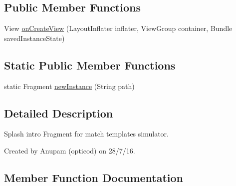 \subsection*{Public Member Functions}
\begin{DoxyCompactItemize}
\item 
View \hyperlink{classorg_1_1buildmlearn_1_1toolkit_1_1matchtemplate_1_1fragment_1_1SplashFragment_a5b24c740ffea58392c92a4217a4dd987}{on\+Create\+View} (Layout\+Inflater inflater, View\+Group container, Bundle saved\+Instance\+State)
\end{DoxyCompactItemize}
\subsection*{Static Public Member Functions}
\begin{DoxyCompactItemize}
\item 
static Fragment \hyperlink{classorg_1_1buildmlearn_1_1toolkit_1_1matchtemplate_1_1fragment_1_1SplashFragment_a62da45592d72fc7caea554cc66562ff7}{new\+Instance} (String path)
\end{DoxyCompactItemize}


\subsection{Detailed Description}
Splash intro Fragment for match template\textquotesingle{}s simulator. 

Created by Anupam (opticod) on 28/7/16. 

\subsection{Member Function Documentation}
